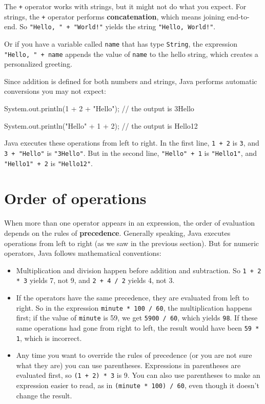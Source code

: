 \documentclass[12pt]{book}
\theoremstyle{exercise}
\newcommand{\java}[1]{\verb"#1"}
\begin{document}
The \java{+} operator works with strings, but it might not do what you expect.
For strings, the \java{+} operator performs {\bf concatenation}, which means joining end-to-end.
So \verb|"Hello, " + "World!"| yields the string \verb|"Hello, World!"|.

Or if you have a variable called \java{name} that has type \java{String}, the expression \verb|"Hello, " + name| appends the value of \java{name} to the hello string, which creates a personalized greeting.

Since addition is defined for both numbers and strings, Java performs automatic conversions you may not expect:

\begin{code}
    System.out.println(1 + 2 + "Hello");
    // the output is 3Hello

    System.out.println("Hello" + 1 + 2);
    // the output is Hello12
\end{code}

Java executes these operations from left to right.
In the first line, \java{1 + 2} is \java{3}, and \verb|3 + "Hello"| is \verb|"3Hello"|.
But in the second line, \verb|"Hello" + 1| is \verb|"Hello1"|, and \verb|"Hello1" + 2| is \verb|"Hello12"|.


\section{Order of operations}


When more than one operator appears in an expression, the order of evaluation depends on the rules of {\bf precedence}.
Generally speaking, Java executes operations from left to right (as we saw in the previous section).
But for numeric operators, Java follows mathematical conventions:

\begin{itemize}

\item Multiplication and division happen before addition and subtraction.
So \java{1 + 2 * 3} yields 7, not 9, and \java{2 + 4 / 2} yields 4, not 3.

\item If the operators have the same precedence, they are evaluated from left to right.
So in the expression \java{minute * 100 / 60}, the multiplication happens first; if the value of \java{minute} is 59, we get \java{5900 / 60}, which yields \java{98}.
If these same operations had gone from right to left, the result would have been \java{59 * 1}, which is incorrect.

\item Any time you want to override the rules of precedence (or you are not sure what they are) you can use parentheses.
Expressions in parentheses are evaluated first, so \java{(1 + 2) * 3} is 9.
You can also use parentheses to make an expression easier to read, as in \java{(minute * 100) / 60}, even though it doesn't change the result.

\end{itemize}
\end{document}
